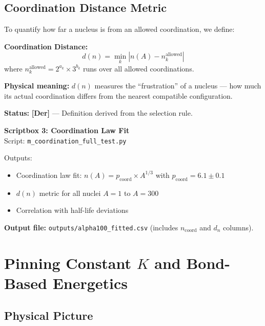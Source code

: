 \documentclass[11pt,a4paper]{article}
\newcommand{\tagDer}{\textcolor{green!50!black}{\textbf{[Der]}}}
\begin{document}
\subsection{Coordination Distance Metric}

To quantify how far a nucleus is from an allowed coordination, we define:

\begin{derivbox}
\textbf{Coordination Distance:}
\begin{equation}
    d(n) = \min_k \left| n(A) - n_k^{\text{allowed}} \right|
    \label{eq:coord_distance}
\end{equation}
where $n_k^{\text{allowed}} = 2^{a_k} \times 3^{b_k}$ runs over all allowed coordinations.

\textbf{Physical meaning:} $d(n)$ measures the ``frustration'' of a nucleus --- how much its actual coordination differs from the nearest compatible configuration.
\end{derivbox}

\textbf{Status:} \tagDer{} --- Definition derived from the selection rule.

\begin{scriptbox}
\textbf{Scriptbox 3: Coordination Law Fit}\\
Script: \texttt{m\_coordination\_full\_test.py}

Outputs:
\begin{itemize}[nosep]
    \item Coordination law fit: $n(A) = p_{\mathrm{coord}} \times A^{1/3}$ with $p_{\mathrm{coord}} = 6.1 \pm 0.1$
    \item $d(n)$ metric for all nuclei $A = 1$ to $A = 300$
    \item Correlation with half-life deviations
\end{itemize}

\textbf{Output file:} \texttt{outputs/alpha100\_fitted.csv} (includes $n_{\mathrm{coord}}$ and $d_n$ columns).
\end{scriptbox}
\label{sb:coordination}

\section{Pinning Constant $K$ and Bond-Based Energetics}
\label{sec:pinning_constant}

\subsection{Physical Picture}
\end{document}
